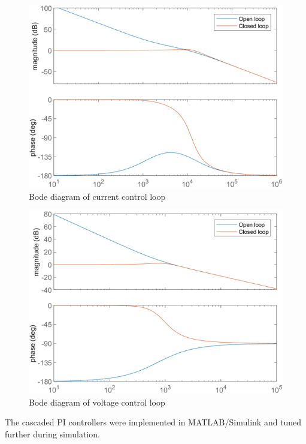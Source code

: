 \begin{figure}[!ht]
    \centering
    \includegraphics[width=0.7\linewidth]{Figures/Bode diagram of current control loop.png}
    \caption{Bode diagram of current control loop}
    \label{fig:bode_current}
\end{figure}

\begin{figure}[!ht]
    \centering
    \includegraphics[width=0.7\linewidth]{Figures/Bode diagram of voltage control loop.png}
    \caption{Bode diagram of voltage control loop}
    \label{fig:bode_voltage}
\end{figure}

The cascaded PI controllers were implemented in MATLAB/Simulink and tuned further during simulation.
